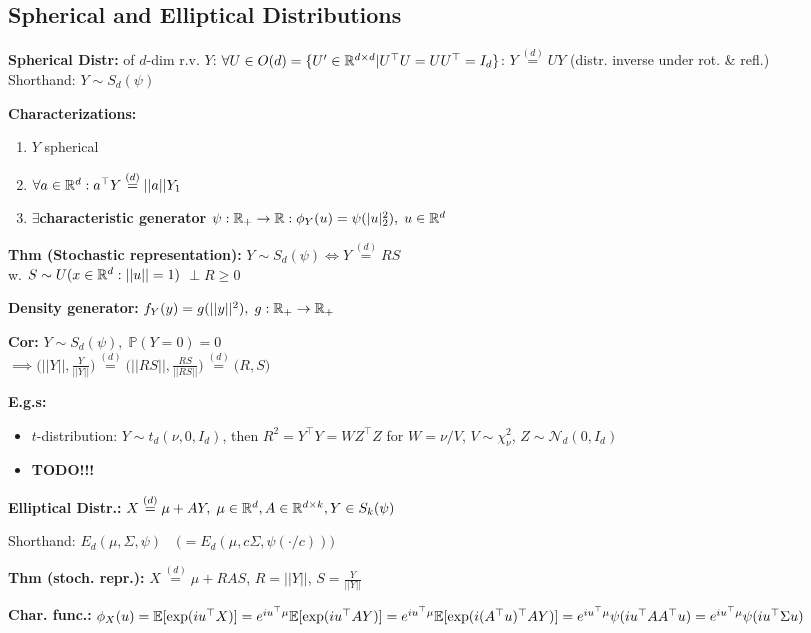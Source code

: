 \subsection*{Spherical and Elliptical Distributions}
\textbf{Spherical Distr:} of $d$-dim r.v. $Y$: $\forall U\in O(d)=\{U'\in\mathbb{R}^{d\times d}|U^\top U=UU^\top = I_d \}$: $Y\stackrel{(d)}{=}UY$
(distr. inverse under rot. \& refl.)\\
Shorthand: $Y\sim S_d(\psi)$

\textbf{Characterizations:}
\begin{enumerate}
    \item $Y$ spherical
    \item $\forall a\in\mathbb{R}^d: a^\top Y \stackrel{(d)}{=}||a||Y_1$
    \item $\exists $\textbf{characteristic generator} $\psi:\mathbb{R}_+\rightarrow \mathbb{R}: \phi_Y(u)=\psi(|u|_2^2),\; u\in\mathbb{R}^d$
\end{enumerate}

\textbf{Thm (Stochastic representation):}
$Y\sim S_d(\psi)\iff Y\stackrel{(d)}{=}RS$\\
w. $S\sim U(x\in\mathbb{R}^d:||u||=1)$ $\perp R\geq 0$

\textbf{Density generator:} $f_Y(y)=g(||y||^2),\; g:\mathbb{R}_+\rightarrow\mathbb{R}_+$

\textbf{Cor:} $Y\sim S_d(\psi),\; \mathbb{P}(Y=0)=0$\\

$\implies
\big(||Y||,\frac{Y}{||Y||}\big)\stackrel{(d)}{=}\big(||RS||,\frac{RS}{||RS||}\big)\stackrel{(d)}{=}\big(R,S\big)$

\textbf{E.g.s:}
\begin{itemize}
    \item $t$-distribution: $Y\sim t_d(\nu, 0, I_d)$, then $R^2=Y^\top Y=WZ^\top Z$ for $W=\nu / V$, $V\sim\chi_\nu^2$, $Z\sim\mathcal{N}_d(0,I_d)$
    \item \textbf{TODO!!!}
\end{itemize}

\textbf{Elliptical Distr.:} $X \stackrel{(d)}{=} \mu + A Y,\; \mu\in\mathbb{R}^d, A\in\mathbb{R}^{d\times k}, Y\in S_k(\psi)$

Shorthand: $E_d(\mu,\Sigma, \psi) \quad \big(=E_d(\mu, c\Sigma, \psi(\cdot/c)) \big)$

\textbf{Thm (stoch. repr.):} $X \stackrel{(d)}{=} \mu + R A S$, $R=||Y||$, $S=\frac{Y}{||Y||}$

\textbf{Char. func.:} $\phi_X(u)=\mathbb{E}[\exp(iu^\top X)]=e^{iu^\top \mu}\mathbb{E}[\exp(iu^\top A Y)]=e^{iu^\top \mu}\mathbb{E}[\exp(i(A^\top u)^\top A Y)]=e^{iu^\top \mu} \psi(iu^\top AA^\top u)=e^{iu^\top \mu} \psi(iu^\top \Sigma u)$



